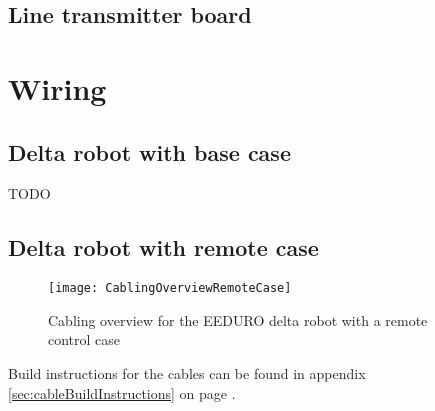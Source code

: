 \section{Line transmitter board}

\chapter{Wiring}
\section{Delta robot with base case}
TODO

\section{Delta robot with remote case}

\begin{figure}[htbp]
	\centering
	\texttt{[image: CablingOverviewRemoteCase]}
	\caption{Cabling overview for the EEDURO delta robot with a remote control case}
	\label{fig:CablingOverviewRemoteCase}
\end{figure}

Build instructions for the cables can be found in appendix \ref{sec:cableBuildInstructions} on page \pageref{sec:cableBuildInstructions}.

